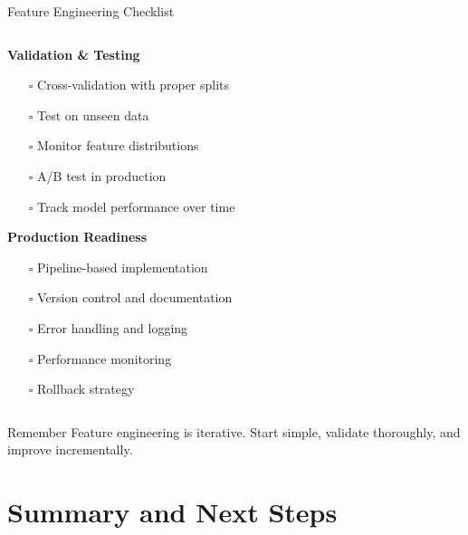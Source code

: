\documentclass[aspectratio=169,11pt]{beamer}
\begin{document}
\begin{frame}{Feature Engineering Checklist}
\begin{columns}
\begin{column}{0.5\textwidth}
\vspace{0.3cm}
\textbf{Validation \& Testing}
\begin{itemize}
\item[$\square$] Cross-validation with proper splits
\item[$\square$] Test on unseen data
\item[$\square$] Monitor feature distributions
\item[$\square$] A/B test in production
\item[$\square$] Track model performance over time
\end{itemize}

\vspace{0.3cm}
\textbf{Production Readiness}
\begin{itemize}
\item[$\square$] Pipeline-based implementation
\item[$\square$] Version control and documentation
\item[$\square$] Error handling and logging
\item[$\square$] Performance monitoring
\item[$\square$] Rollback strategy
\end{itemize}
\end{column}
\end{columns}

\begin{alertblock}{Remember}
Feature engineering is iterative. Start simple, validate thoroughly, and improve incrementally.
\end{alertblock}
\end{frame}

\section{Summary and Next Steps}
\end{document}
